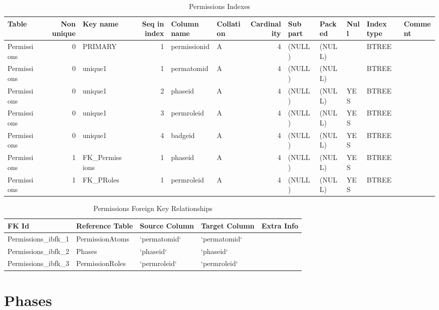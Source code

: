 \documentclass[captions=tablesignature]{scrartcl}
\begin{document}
\begin{table}[htb]
\caption{\label{tbl:permissionsindexes}Permissions Indexes}
\centering
\begin{tabular}{lrlrllrlllll}
\hline
Table & Non unique & Key name & Seq in index & Column name & Collation & Cardinality & Sub part & Packed & Null & Index type & Comment\\
\hline
Permissions & 0 & PRIMARY & 1 & permissionid & A & 4 & (NULL) & (NULL) &  & BTREE & \\
Permissions & 0 & unique1 & 1 & permatomid & A & 4 & (NULL) & (NULL) &  & BTREE & \\
Permissions & 0 & unique1 & 2 & phaseid & A & 4 & (NULL) & (NULL) & YES & BTREE & \\
Permissions & 0 & unique1 & 3 & permroleid & A & 4 & (NULL) & (NULL) & YES & BTREE & \\
Permissions & 0 & unique1 & 4 & badgeid & A & 4 & (NULL) & (NULL) & YES & BTREE & \\
Permissions & 1 & FK\_Permissions & 1 & phaseid & A & 4 & (NULL) & (NULL) & YES & BTREE & \\
Permissions & 1 & FK\_PRoles & 1 & permroleid & A & 4 & (NULL) & (NULL) & YES & BTREE & \\
\hline
\end{tabular}
\end{table}

\begin{table}[htb]
\caption{\label{tbl:permissionsfkr}Permissions Foreign Key Relationships}
\centering
\begin{tabular}{lllll}
\hline
FK Id & Reference Table & Source Column & Target Column & Extra Info\\
\hline
Permissions\_ibfk\_1 & PermissionAtoms & `permatomid` & `permatomid` & \\
Permissions\_ibfk\_2 & Phases & `phaseid` & `phaseid` & \\
Permissions\_ibfk\_3 & PermissionRoles & `permroleid` & `permroleid` & \\
\hline
\end{tabular}
\end{table}
\section{Phases}
\label{sec-16}
\end{document}
